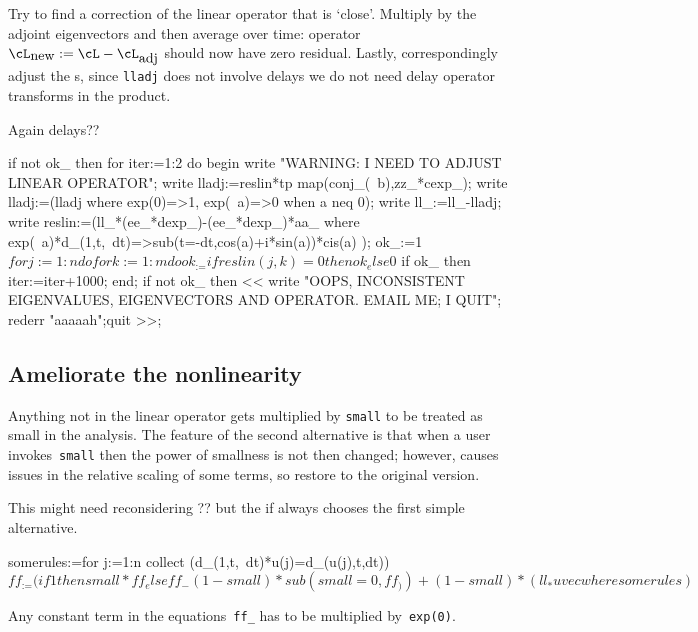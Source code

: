 \documentclass[11pt,a5paper]{article}
\begin{document}
Try to find a correction of the linear operator that is `close'.
Multiply by the adjoint eigenvectors and then average over time: operator \(\cL_{\text{new}}:=\cL-\cL_{\text{adj}}\) should now have zero residual.
Lastly, correspondingly adjust the \ode{}s, since \verb|lladj| does not involve delays we do not need delay operator transforms in the product.

Again delays??

\begin{reduce}
if not ok_ then for iter:=1:2 do begin
write "WARNING: I NEED TO ADJUST LINEAR OPERATOR";
write
lladj:=reslin*tp map(conj_(~b),zz_*cexp_);
write
lladj:=(lladj where {exp(0)=>1, exp(~a)=>0 when a neq 0});
write
ll_:=ll_-lladj;
write
reslin:=(ll_*(ee_*dexp_)-(ee_*dexp_)*aa_
    where exp(~a)*d_(1,t,~dt)=>sub(t=-dt,cos(a)+i*sin(a))*cis(a) ); 
ok_:=1$
for j:=1:n do for k:=1:m do 
    ok_:=if reslin(j,k)=0 then ok_ else 0$
if ok_ then iter:=iter+1000;
end;
if not ok_ then << write
    "OOPS, INCONSISTENT EIGENVALUES, EIGENVECTORS AND OPERATOR.
    EMAIL ME; I QUIT"; rederr "aaaaah";quit >>;
\end{reduce}




\subsection{Ameliorate the nonlinearity}

Anything not in the linear operator gets multiplied by \verb|small| to be treated as small in the analysis.
The feature of the second alternative is that when a user invokes~\verb|small| then the power of smallness is not then changed; however, causes issues in the relative scaling of some terms, so restore to the original version.

This might need reconsidering ??  but the if always chooses the first simple alternative.
\begin{reduce}
somerules:=for j:=1:n collect 
  (d_(1,t,~dt)*u(j)=d_(u(j),t,dt))$
ff_:=(if 1 then small*ff_
    else ff_-(1-small)*sub(small=0,ff_)) +(1-small)
    *(ll_*uvec where somerules)$
\end{reduce}

Any constant term in the equations~\verb|ff_| has to be multiplied by~\verb|exp(0)|.
\end{document}
